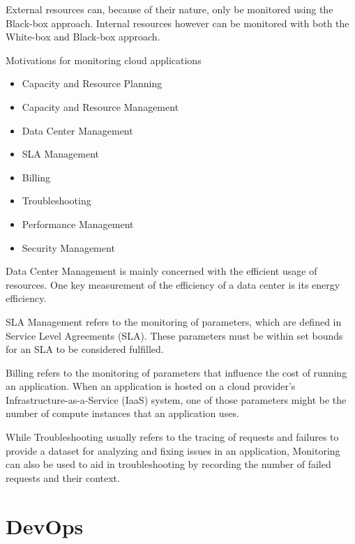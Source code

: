External resources can, because of their nature, only be monitored using the Black-box approach.
Internal resources however can be monitored with both the White-box and Black-box approach.

Motivations for monitoring cloud applications \cite{6483656}
\begin{itemize}
    \item Capacity and Resource Planning
    \item Capacity and Resource Management
    \item Data Center Management
    \item SLA Management
    \item Billing
    \item Troubleshooting
    \item Performance Management
    \item Security Management
\end{itemize}



Data Center Management is mainly concerned with the efficient usage of resources.
One key measurement of the efficiency of a data center is its energy efficiency.

SLA Management refers to the monitoring of parameters, which are defined in Service Level Agreements (SLA).
These parameters must be within set bounds for an SLA to be considered fulfilled.

Billing refers to the monitoring of parameters that influence the cost of running an application.
When an application is hosted on a cloud provider's Infrastructure-as-a-Service (IaaS) system,
one of those parameters might be the number of compute instances that an application uses.

While Troubleshooting usually refers to the tracing of requests and failures to provide a dataset for analyzing and fixing issues in an application,
Monitoring can also be used to aid in troubleshooting by recording the number of failed requests and their context.



\section{DevOps}

